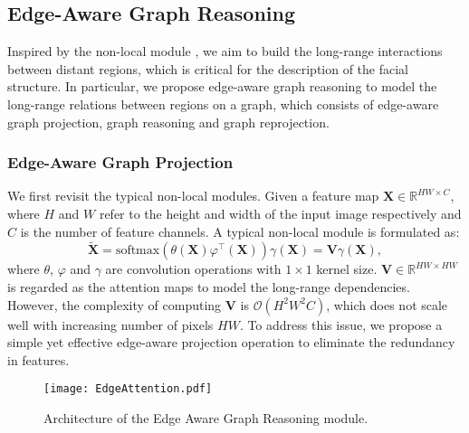 \documentclass[runningheads]{llncs}
\def\V{{\mathbf V}}
\def\X{{\mathbf X}}
\begin{document}
\subsection{Edge-Aware Graph Reasoning}\label{sec3.2}

Inspired by the non-local module \cite{wang2018non}, we aim to build the long-range interactions between distant regions, which is critical for the description of the facial structure. 
In particular, we propose edge-aware graph reasoning to model the long-range relations between regions on a graph, which consists of edge-aware graph projection, graph reasoning and graph reprojection.  



\subsubsection{Edge-Aware Graph Projection}
\label{subsubsec:projection}

We first revisit the typical non-local modules. 
Given a feature map $\X \in \mathbb{R}^{HW \times C}$,  where $H$ and $W$ refer to the height and width of the input image respectively and $C$ is the number of feature channels. 
A typical non-local module is formulated as:
\begin{equation}
\label{eq:non_local}
\widetilde{\X} = \text{softmax}\left(\theta(\X)\varphi^{\top}(\X)\right)\gamma(\X) = \V\gamma(\X),
\end{equation}
where $\theta$, $\varphi$ and $\gamma$ are convolution operations with $ 1 \times 1$ kernel size. 
$\V \in \mathbb{R}^{HW \times HW}$ is regarded as the attention maps to model the long-range dependencies. 
However, the complexity of computing $\V$ is $\mathcal{O}(H^2W^2C)$, which does not scale well with increasing number of pixels $HW$. 
To address this issue, we propose a simple yet effective edge-aware projection operation to eliminate the redundancy in features.

\begin{figure}[t]
    \centering
    \texttt{[image: EdgeAttention.pdf]}
\caption{Architecture of the Edge Aware Graph Reasoning module.}
        \label{fig:module}
\end{figure}
\end{document}
